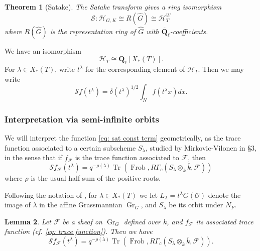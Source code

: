 \documentclass[reqno]{amsart}
\numberwithin{equation}{section}
\newcommand{\Q}{\mathbf{Q}}
\newcommand{\ol}[1]{\overline{#1}}
\newcommand{\wh}[1]{\widehat{#1}}
\newcommand{\Cal}[1]{\mathcal{#1}}
\newcommand{\co}{\colon}
\DeclareMathOperator{\Frob}{Frob}
\DeclareMathOperator{\Tr}{Tr}
\DeclareMathOperator{\Gr}{Gr}
\newtheorem{thm}{Theorem}[section]
\newtheorem{lemma}[thm]{Lemma}
\theoremstyle{remark}
\numberwithin{equation}{section}
\begin{document}
\begin{thm}[Satake]\label{Satake transform} The Satake transform gives a ring isomorphism 
\[
\Cal{S} \co \Cal{H}_{G,K} \cong R(\wh{G})  \cong \Cal{H}_T^W 
\]
where $R(\wh{G})$ is the representation ring of $\wh{G}$ with $\ol{\Q}_{\ell}$-coefficients. 
\end{thm}

We have an isomorphism 
\[
\Cal{H}_T \cong  \Q_{\ell}[X_*(T)].
\]
For $\lambda \in X_*(T)$, write  $t^{\lambda}$ for the corresponding element of $\Cal{H}_T$. Then we may write 
\begin{equation}\label{eq: sat const term}
\Cal{S}f(t^{\lambda}) =  \delta(t^{\lambda})^{1/2}  \int_{N} f(t^{\lambda} x) dx.
\end{equation}


\subsubsection{Interpretation via semi-infinite orbits} We will interpret the function \eqref{eq: sat const term} geometrically, as the trace function associated to a certain subscheme $S_{\lambda}$, studied by Mirkovic-Vilonen in \cite{MV07} \S 3, in the sense that if $f_{\Cal{F}}$ is the trace function associated to $\Cal{F}$, then 
\[
\Cal{S}f_{\Cal{F}}(t^{\lambda}) = q^{-\rho(\lambda)} \Tr(\Frob, R\Gamma_c (S_{\lambda} \otimes_k \ol{k}, \Cal{F}))
\]
where $\rho$ is the usual half sum of the positive roots. 

Following the notation of \cite{MV07}, for $\lambda \in X_*(T)$ we let $L_{\lambda} =  t^{\lambda} G(\Cal{O}) $ denote the image of $\lambda$ in the affine Grassmannian $\Gr_{G}$, and $S_{\lambda}$ be its orbit under $N_F$. 



\begin{lemma}\label{geometrize satake transform} Let $\Cal{F}$ be a sheaf on $\Gr_G$ defined over $k$, and $f_{\Cal{F}}$ its associated trace function (cf. \eqref{eq: trace function}). Then we have 
\[
\Cal{S}f_{\Cal{F}}(t^{\lambda}) = q^{-\rho( \lambda)} \Tr(\Frob, R\Gamma_c (S_{\lambda} \otimes_k \ol{k}, \Cal{F})).
\]
\end{lemma}
\end{document}
